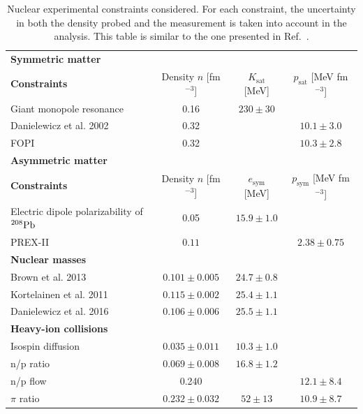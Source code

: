 \documentclass[prd,twocolumn,a4paper,floatfix,nofootinbib,preprintnumbers,superscriptaddress]{revtex4-1}
\begin{document}
\begin{table}
    \caption{Nuclear experimental constraints considered. For each constraint, the uncertainty in both the density probed and the measurement is taken into account in the analysis. This table is similar to the one presented in Ref.~\cite{Tsang:2023vhh}.}
    \label{tab:nuclear_constraints}
    \centering
    \begin{tabular*}{\textwidth}{@{\extracolsep{\fill}}lccc}
        \hline
        \textbf{Symmetric matter} &&& \\
        \textbf{Constraints} & Density $n$ [fm$^{-3}$] & $K_\text{sat}$ [MeV] & $p_\text{sat}$ [MeV fm$^{-3}$]\\
        \hline
        Giant monopole resonance~\cite{Dutra:2012mb}       & 0.16 &     $230 \pm 30$ & \\
        Danielewicz et al. 2002~\cite{Danielewicz:2002pu}  & 0.32 &   & $10.1 \pm 3.0$ \\
        FOPI~\cite{LeFevre:2015paj} & 0.32 &  & $10.3 \pm 2.8$ \\
        \hline
        \textbf{Asymmetric matter} &&& \\
        \textbf{Constraints} & Density $n$ [fm$^{-3}$] & $e_\text{sym}$ [MeV] & $p_\text{sym}$ [MeV fm$^{-3}$] \\
        \hline
        Electric dipole polarizability of $^{208}{\rm Pb}$~\cite{Zhang:2015ava} & 0.05  & $15.9 \pm 1.0$  &                 \\
        PREX-II~\cite{PREX:2021umo,Reed:2021nqk,Lynch:2021xkq} & $0.11$ & & $2.38\pm0.75$ \\
        {\textbf{Nuclear masses}} &&& \\
        Brown et al. 2013~\cite{Brown:2013mga,Lynch:2021xkq} & $0.101 \pm 0.005$  & $24.7 \pm 0.8$   &         \\    
        Kortelainen et al. 2011~\cite{Kortelainen:2011ft,Lynch:2021xkq}   & $0.115 \pm 0.002$  & $25.4 \pm 1.1$   &     \\
        Danielewicz et al. 2016~\cite{Danielewicz:2016bgb,Lynch:2021xkq}  & $0.106 \pm 0.006$  & $25.5 \pm 1.1$   &     \\
        {\textbf{Heavy-ion collisions}} &&& \\
        \hspace{0.05cm}Isospin diffusion~\cite{Tsang:2008fd,Lynch:2021xkq}     & $0.035 \pm 0.011$  & $10.3 \pm 1.0$   &                \\
        \hspace{0.05cm}n/p ratio~\cite{Morfouace:2019jky,Lynch:2021xkq}   & $0.069 \pm 0.008$  & $16.8 \pm 1.2$   &                \\
        \hspace{0.05cm}n/p flow~\cite{Cozma:2017bre,Russotto:2011hq,Russotto:2016ucm,Lynch:2021xkq}    & 0.240              &                  & $12.1 \pm 8.4$ \\
        \hspace{0.05cm}$\pi$ ratio~\cite{SpiRIT:2021gtq,Lynch:2021xkq}       & $0.232 \pm 0.032$  & $52 \pm 13$      & $10.9 \pm 8.7$ \\
        \hline
    \end{tabular*}
\end{table}
\end{document}
